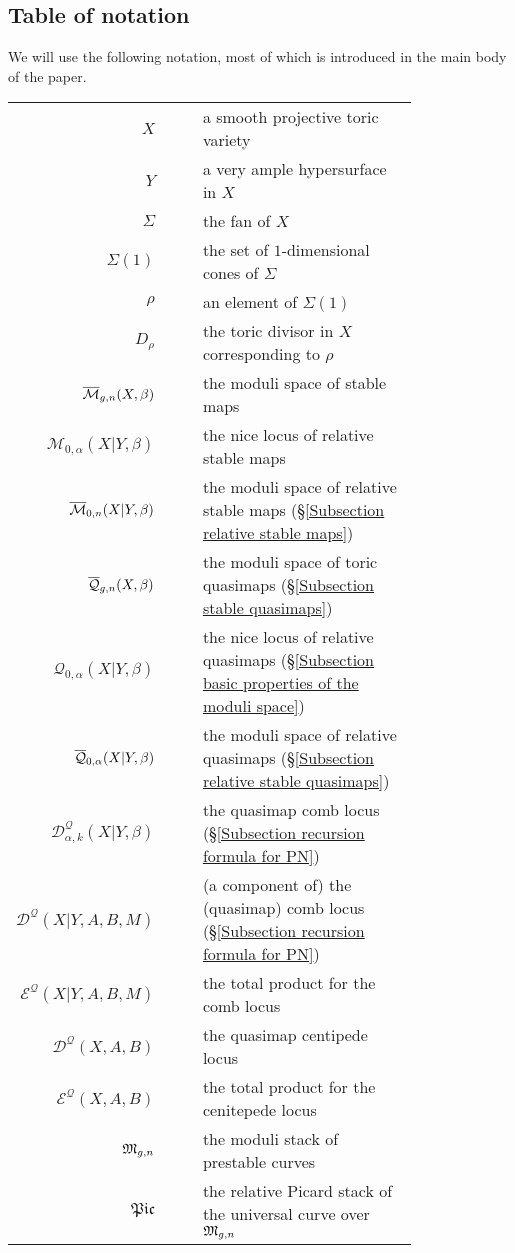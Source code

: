 \subsection{Table of notation} We will use the following notation, most of which is introduced in the main body of the paper.
\begin{longtabu}{r c | c p{0.8\linewidth}}
$X$ & & & a smooth projective toric variety \\
$Y$ & & & a very ample hypersurface in $X$ \\
$\Sigma$ & & & the fan of $X$ \\
$\Sigma(1)$ & & & the set of $1$-dimensional cones of $\Sigma$ \\
$\rho$ & & & an element of $\Sigma(1)$ \\
$D_\rho$ & & & the toric divisor in $X$ corresponding to $\rho$ \\
$\overline{\mathcal M}_{g,n}(X,\beta)$ & & & the moduli space of stable maps \\
$\mathcal{M}_{0,\alpha}(X|Y,\beta)$ & & & the nice locus of relative stable maps \\
$\overline{\mathcal M}_{0,n}(X|Y,\beta)$ & & & the moduli space of relative stable maps (\S \ref{Subsection relative stable maps}) \\
$\overline{\mathcal Q}_{g,n}(X,\beta)$ & & & the moduli space of toric quasimaps (\S \ref{Subsection stable quasimaps}) \\
$\mathcal{Q}_{0,\alpha}(X|Y,\beta)$ & & & the nice locus of relative quasimaps (\S \ref{Subsection basic properties of the moduli space}) \\
$\overline{\mathcal Q}_{0,\alpha}(X|Y,\beta)$ & & & the moduli space of relative quasimaps (\S \ref{Subsection relative stable quasimaps}) \\
$\mathcal{D}^{\mathcal{Q}}_{\alpha,k}(X|Y,\beta)$ & & & the quasimap comb locus (\S \ref{Subsection recursion formula for PN}) \\
$\mathcal{D}^{\mathcal{Q}}(X|Y,A,B,M)$ & & & (a component of) the (quasimap) comb locus (\S \ref{Subsection recursion formula for PN}) \\
$\mathcal{E}^{\mathcal{Q}}(X|Y,A,B,M)$ & & & the total product for the comb locus \\
$\mathcal{D}^{\mathcal{Q}}(X,A,B)$ & & & the quasimap centipede locus \\
$\mathcal{E}^{\mathcal{Q}}(X,A,B)$ & & & the total product for the cenitepede locus \\
$\mathfrak M_{g,n}$ & & & the moduli stack of prestable curves \\
$\mathfrak{Pic}$ & & & the relative Picard stack of the universal curve over $\mathfrak M_{g,n}$ \\

\end{longtabu}
